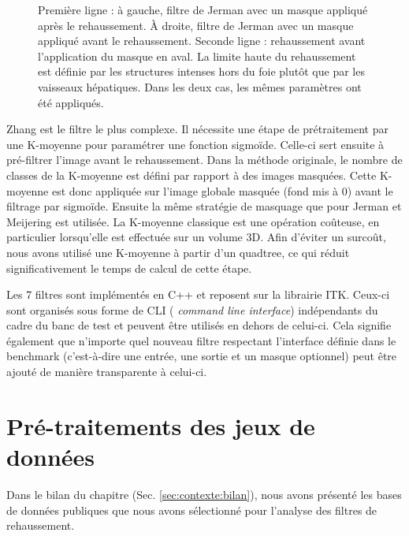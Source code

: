 \begin{figure}[!ht]
  \centering
  \caption{Première ligne : à gauche, filtre de Jerman avec un masque appliqué après le rehaussement. À droite, filtre de Jerman avec un masque appliqué avant le rehaussement. Seconde ligne : rehaussement avant l'application du masque en aval. La limite haute du rehaussement est définie par les structures intenses hors du foie plutôt que par les vaisseaux hépatiques. Dans les deux cas, les mêmes paramètres ont été appliqués.}
  \label{fig:smart_mask_effect}
\end{figure}

Zhang est le filtre le plus complexe. Il nécessite une étape de prétraitement par une K-moyenne pour paramétrer une fonction sigmoïde. Celle-ci sert ensuite à pré-filtrer l'image avant le rehaussement. Dans la méthode originale, le nombre de classes de la K-moyenne est défini par rapport à des images masquées. Cette K-moyenne est donc appliquée sur l'image globale masquée (fond mis à 0) avant le filtrage par sigmoïde. Ensuite la même stratégie de masquage que pour Jerman et Meijering est utilisée. La K-moyenne classique est une opération coûteuse, en particulier lorsqu'elle est effectuée sur un volume 3D. Afin d'éviter un surcoût, nous avons utilisé une K-moyenne à partir d'un quadtree, ce qui réduit significativement le temps de calcul de cette étape.

Les 7 filtres sont implémentés en C++ et reposent sur la librairie ITK. Ceux-ci sont organisés sous forme de CLI ( \textit{command line interface}) indépendants du cadre du banc de test et peuvent être utilisés en dehors de celui-ci. Cela signifie également que n'importe quel nouveau filtre respectant l'interface définie dans le benchmark (c'est-à-dire une entrée, une sortie et un masque optionnel) peut être ajouté de manière transparente à celui-ci.

\section{Pré-traitements des jeux de données}
\label{sec:Benchmark:traitement_des_données}

Dans le bilan du chapitre \chapContextN{} (Sec. \ref{sec:contexte:bilan}), nous avons présenté les bases de données publiques que nous avons sélectionné pour l'analyse des filtres de rehaussement.

